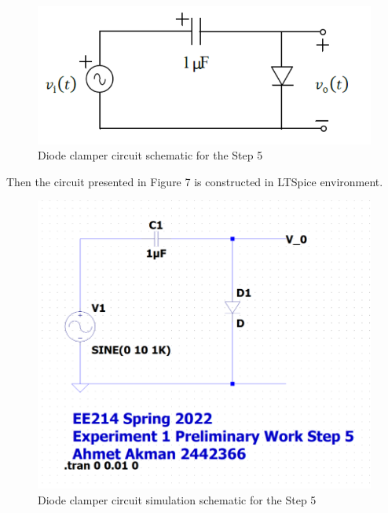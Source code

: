 \documentclass[letterpaper,12pt]{article}
\begin{document}
\begin{figure}[H]
    \centering
   \includegraphics[width=1\textwidth]{5_1.png}
   \caption{Diode clamper circuit schematic for the Step 5}
\end{figure} 
Then the circuit presented in Figure 7 is constructed in LTSpice environment.
\begin{figure}[H]
    \centering
   \includegraphics[width=1\textwidth]{5SCH.png}
   \caption{Diode clamper circuit simulation schematic for the Step 5}
\end{figure} 
\end{document}
